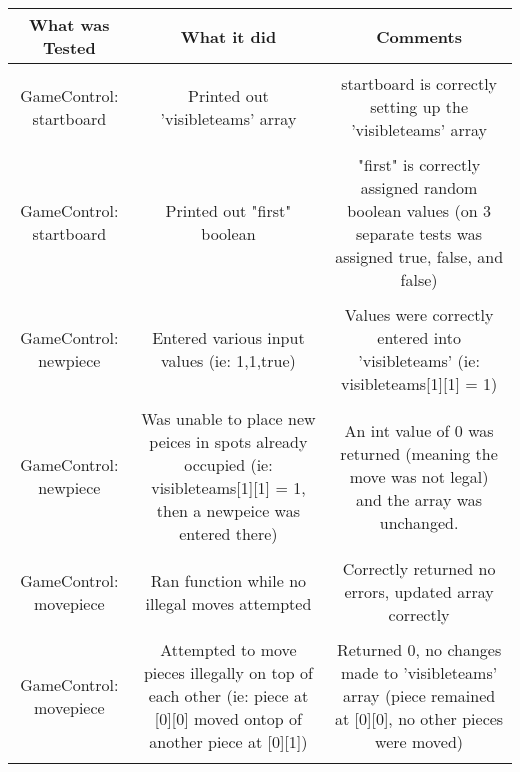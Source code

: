 \documentclass[12pt]{article}
\begin{document}
	\begin{tabularx}{\linewidth}{|C|C|C|}
		\hline
		What was Tested & What it did & Comments \\
		\hline \\
    GameControl: startboard & Printed out 'visibleteams' array & startboard is correctly setting up the 'visibleteams' array \\
    \hline \\
    GameControl: startboard & Printed out "first" boolean & "first" is correctly assigned random boolean values (on 3 separate tests was assigned true, false, and false) \\
    \hline \\
    GameControl: newpiece & Entered various input values (ie: 1,1,true) & Values were correctly entered into 'visibleteams' (ie: visibleteams[1][1] = 1) \\
    \hline \\
    GameControl: newpiece & Was unable to place new peices in spots already occupied (ie: visibleteams[1][1] = 1, then a newpeice was entered there) & An int value of 0 was returned (meaning the move was not legal) and the array was unchanged. \\ 
    \hline \\
    GameControl: movepiece & Ran function while no illegal moves attempted & Correctly returned no errors, updated array correctly \\
    \hline \\
    GameControl: movepiece & Attempted to move pieces illegally on top of each other (ie: piece at [0][0] moved ontop of another piece at [0][1]) & Returned 0, no changes made to 'visibleteams' array (piece remained at [0][0], no other pieces were moved) \\
    \hline \\
	\end{tabularx}
	
\end{document}
